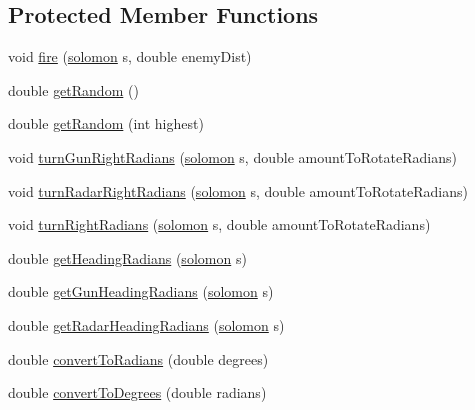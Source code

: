 \subsection*{Protected Member Functions}
\begin{DoxyCompactItemize}
\item 
void \hyperlink{classitc_1_1_c_tactic_a3d4f7c60b5eb048608b96e4c8c8fad24}{fire} (\hyperlink{classitc_1_1solomon}{solomon} s, double enemyDist)
\item 
double \hyperlink{classitc_1_1_c_tactic_ae1e7b81085c04b6d03be93dfefec5b0f}{getRandom} ()
\item 
double \hyperlink{classitc_1_1_c_tactic_a89a1395008161bfeed448b60a4addc7d}{getRandom} (int highest)
\item 
void \hyperlink{classitc_1_1_c_tactic_aadc353c46b7efae5844a1803dff12ce7}{turnGunRightRadians} (\hyperlink{classitc_1_1solomon}{solomon} s, double amountToRotateRadians)
\item 
void \hyperlink{classitc_1_1_c_tactic_a93bd30da3b2689b475ab0bdc9220ae77}{turnRadarRightRadians} (\hyperlink{classitc_1_1solomon}{solomon} s, double amountToRotateRadians)
\item 
void \hyperlink{classitc_1_1_c_tactic_a6ec9c0ec24314d590adbd737bbf8be35}{turnRightRadians} (\hyperlink{classitc_1_1solomon}{solomon} s, double amountToRotateRadians)
\item 
double \hyperlink{classitc_1_1_c_tactic_a8f926b64924184c4dab8a3c5efa5d410}{getHeadingRadians} (\hyperlink{classitc_1_1solomon}{solomon} s)
\item 
double \hyperlink{classitc_1_1_c_tactic_a3218f6ba011510c64b12d87bed7adfcb}{getGunHeadingRadians} (\hyperlink{classitc_1_1solomon}{solomon} s)
\item 
double \hyperlink{classitc_1_1_c_tactic_a4d8a555f548ee605c6d67de1e262b455}{getRadarHeadingRadians} (\hyperlink{classitc_1_1solomon}{solomon} s)
\item 
double \hyperlink{classitc_1_1_c_tactic_a0fb7344f1a8072b2f764f7b76444b89e}{convertToRadians} (double degrees)
\item 
double \hyperlink{classitc_1_1_c_tactic_a89700cf4d890854f0c310a82e8f4fb8d}{convertToDegrees} (double radians)
\end{DoxyCompactItemize}
